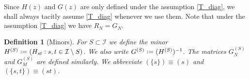 \documentclass[11pt]{article} %
\numberwithin{equation}{section}
\numberwithin{figure}{section}
\theoremstyle{plain} %
\newtheorem{definition}[theorem]{Definition}
\theoremstyle{definition} %
\renewcommand{\cal}{\mathcal}
\newcommand{\col}{\mathrel{\vcenter{\baselineskip0.75ex \lineskiplimit0pt \hbox{.}\hbox{.}}}}
\newcommand*{\deq}{\mathrel{\vcenter{\baselineskip0.65ex \lineskiplimit0pt \hbox{.}\hbox{.}}}=}
\begin{document}
Since $H(z)$ and $G(z)$ are only defined under the assumption \eqref{T_diag}, we shall always tacitly assume \eqref{T_diag} whenever we use them. Note that under the assumption \eqref{T_diag} we have $R_N = G_N$.


\begin{definition}[Minors] \label{def:minors}
For $S \subset \cal I$ we define the minor
$H^{(S)} \deq (H_{st} \col s,t \in \cal I \setminus S)$.
We also write
$G^{(S)} \deq (H^{(S)})^{-1}$.
The matrices $G_N^{(S)}$ and $G_M^{(S)}$ are defined similarly. We abbreviate $(\{s\}) \equiv (s)$ and $(\{s,t\}) \equiv (st)$.
\end{definition}



\bigskip
\end{document}
